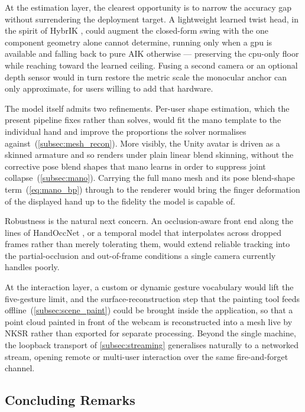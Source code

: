 At the estimation layer, the clearest opportunity is to narrow the accuracy gap without
surrendering the deployment target. A lightweight learned twist head, in the spirit of
HybrIK \cite{li2022hybrik}, could augment the closed-form swing with the one component
geometry alone cannot determine, running only when a \acrshort{gpu} is available and
falling back to pure AIK otherwise --- preserving the \acrshort{cpu}-only floor while
reaching toward the learned ceiling. Fusing a second camera or an optional depth sensor
would in turn restore the metric scale the monocular anchor can only approximate, for
users willing to add that hardware.

The model itself admits two refinements. Per-user shape estimation, which the present
pipeline fixes rather than solves, would fit the \acrshort{mano} template to the
individual hand and improve the proportions the solver normalises
against~(\autoref{subsec:mesh_recon}). More visibly, the Unity avatar is driven as a
skinned armature and so renders under plain linear blend skinning, without the
corrective pose blend shapes that \acrshort{mano} learns in order to suppress joint
collapse~(\autoref{subsec:mano}). Carrying the full \acrshort{mano} mesh and its pose
blend-shape term~(\autoref{eq:mano_bp}) through to the renderer would bring the finger
deformation of the displayed hand up to the fidelity the model is capable of.

Robustness is the natural next concern. An occlusion-aware front end along the lines of
HandOccNet \cite{park2022handoccnet}, or a temporal model that interpolates across
dropped frames rather than merely tolerating them, would extend reliable tracking into
the partial-occlusion and out-of-frame conditions a single camera currently handles
poorly.

At the interaction layer, a custom or dynamic gesture vocabulary would lift the
five-gesture limit, and the surface-reconstruction step that the painting tool feeds
offline~(\autoref{subsec:scene_paint}) could be brought inside the application, so that
a point cloud painted in front of the webcam is reconstructed into a mesh live by
NKSR \cite{huang2023nksr} rather than exported for separate processing. Beyond the
single machine, the loopback transport of \autoref{subsec:streaming} generalises
naturally to a networked stream, opening remote or multi-user interaction over the same
fire-and-forget channel.

\subsection{Concluding Remarks}\label{subsec:conclusion_closing}

